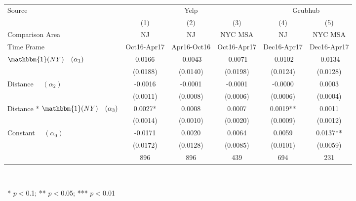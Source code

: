 \begin{center}
\begin{tabular}{lccccc}
\hline Source & \multicolumn{3}{c}{Yelp} & \multicolumn{2}{c}{Grubhub}\\
 & (1) & (2) & (3) & (4) & (5)\\
Comparison Area &   NJ    &   NJ    & NYC MSA &   NJ    & NYC MSA\\
Time Frame & Oct16-Apr17 & Apr16-Oct16 & Oct16-Apr17 & Dec16-Apr17 & Dec16-Apr17\\
\hline  $ \mathbbm{1}(NY) \quad (\alpha_1) $  & 0.0166 & -0.0043 & -0.0071 & -0.0102 & -0.0134\\
  & (0.0188) & (0.0140) & (0.0198) & (0.0124) & (0.0128)\\
 Distance $\quad (\alpha_2) $  & -0.0016 & -0.0001 & -0.0001 & -0.0000 & 0.0003\\
  & (0.0011) & (0.0008) & (0.0006) & (0.0006) & (0.0004)\\
 Distance * $ \mathbbm{1}(NY) \quad (\alpha_3) $  & 0.0027* & 0.0008 & 0.0007 & 0.0019** & 0.0011\\
  & (0.0014) & (0.0010) & (0.0020) & (0.0009) & (0.0012)\\
 Constant $\quad (\alpha_0) $  & -0.0171 & 0.0020 & 0.0064 & 0.0059 & 0.0137**\\
 & (0.0172) & (0.0128) & (0.0085) & (0.0101) & (0.0059)\\
\hline  & 896 & 896 & 439 & 694 & 231\\
\hline\end{tabular}\\
\begin{tiny}\ * $p<0$.1; ** $p<0$.05; *** $p<0$.01\end{tiny}\\
\end{center}
